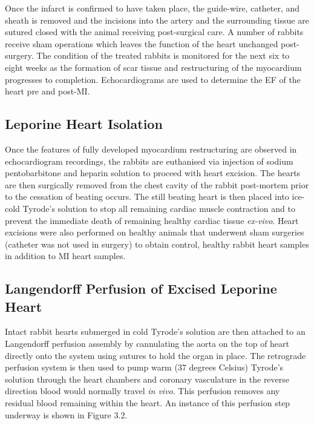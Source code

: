  Once the infarct is confirmed to have taken place, the guide-wire, catheter, and sheath is removed and the incisions into the artery and the surrounding tissue are sutured closed with the animal receiving post-surgical care. A number of rabbits receive sham operations which leaves the function of the heart unchanged post-surgery. The condition of the treated rabbits is monitored for the next six to eight weeks as the formation of scar tissue and restructuring of the myocardium progresses to completion. Echocardiograms are used to determine the EF of the heart pre and post-MI. 


\subsection{Leporine Heart Isolation}
Once the features of fully developed myocardium restructuring are observed in echocardiogram recordings, the rabbits are euthanised via injection of sodium pentobarbitone and heparin solution to proceed with heart excision. The hearts are then surgically removed from the chest cavity of the rabbit post-mortem prior to the cessation of beating occurs. The still beating heart is then placed into ice-cold Tyrode's solution to stop all remaining cardiac muscle contraction and to prevent the immediate death of remaining healthy cardiac tissue \textit{ex-vivo}. Heart excisions were also performed on healthy animals that underwent sham surgeries (catheter was not used in surgery) to obtain control, healthy rabbit heart samples in addition to MI heart samples.



\subsection{Langendorff Perfusion of Excised Leporine Heart}
Intact rabbit hearts submerged in cold Tyrode's solution are then attached to an Langendorff perfusion assembly by cannulating the aorta on the top of heart directly onto the system using sutures to hold the organ in place. The retrograde perfusion system is then used to pump warm (37 degrees Celsius) Tyrode's solution through the heart chambers and coronary vasculature in the reverse direction blood would normally travel \textit{in vivo}. This perfusion removes any residual blood remaining within the heart. An instance of this perfusion step underway is shown in Figure 3.2.


